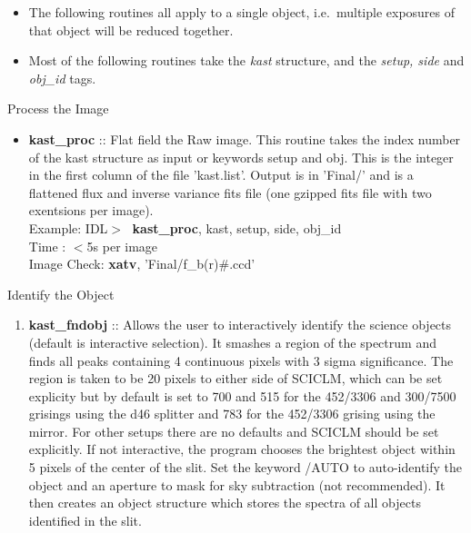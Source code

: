 \documentclass[11pt,letterpaper,dvips]{article}
\begin{document}
  \begin{itemize}
	\item The following routines all apply to a single object, i.e.\
	multiple exposures of that object will be reduced together.
	\item Most of the following routines take the {\it kast} structure,
	and the {\it setup, side} and {\it obj\_id} tags. 
  \end{itemize}

\begin{enumerate}

{\Large  \item Process the Image}

  \begin{itemize}
	\item {\bf kast\_proc} :: Flat field the Raw image.
	This routine takes the index number of the kast structure as input
	or keywords setup and obj.
	This is the integer in the first column of the file 'kast.list'.
	Output is in 'Final/' and is a flattened flux and inverse variance fits file
	(one gzipped fits file with two exentsions per image). \\
         \quad Example: IDL$> \;$ {\bf kast\_proc}, kast, setup, side, obj\_id  \\
         \quad Time   : $<$5s per image \\
	 \quad Image Check: {\bf xatv}, 'Final/f\_b(r)\#.ccd'

  \end{itemize}

{\Large  \item Identify the Object}

  \begin{enumerate}
	\item {\bf kast\_fndobj} :: Allows the user to interactively identify
	the science objects (default is interactive selection).   It smashes a
	region of the spectrum and finds all peaks containing 4
	continuous pixels with 3 sigma significance.  The region is taken
	to be 20 pixels to either side of SCICLM, which can be set 
	explicity but by default is set to 700 and 515 for the 452/3306 and
	300/7500 grisings using the d46 splitter and 783 for the 452/3306 
	grising using the mirror.  For other setups there are no defaults and 
	SCICLM should be set explicitly.
	If not interactive, the program chooses the brightest object within
	5 pixels of the center of the slit.  Set the keyword /AUTO to 
	auto-identify the object and an aperture to mask for
	sky subtraction (not recommended).
	It then creates an object structure which
	stores the spectra of all objects identified in the slit.


\end{enumerate}
\end{enumerate}
\end{document}
